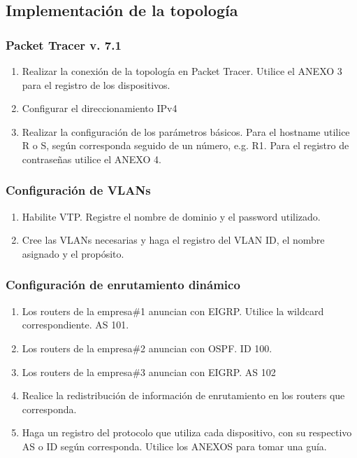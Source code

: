 \documentclass[12pt]{article}
\begin{document}
\subsection{Implementación de la topología}
\subsubsection{Packet Tracer v. 7.1}
\begin{enumerate}
\item Realizar la conexión de la topología en Packet Tracer. Utilice el ANEXO 3 para el registro de los dispositivos.
\item Configurar el direccionamiento IPv4
\item Realizar la configuración de los parámetros básicos. Para el hostname utilice R o S, según corresponda seguido de un número, e.g. R1. Para el registro de contraseñas utilice el ANEXO 4.
\end{enumerate}

\subsubsection{Configuración de VLANs}
\begin{enumerate}
\item Habilite VTP. Registre el nombre de dominio y el password utilizado.
\item Cree las VLANs necesarias y haga el registro del VLAN ID, el nombre asignado y el propósito.
\end{enumerate}

\subsubsection{Configuración de enrutamiento dinámico}
\begin{enumerate}
\item Los routers de la empresa\#1 anuncian con EIGRP. Utilice la wildcard correspondiente. AS 101.
\item Los routers de la empresa\#2 anuncian con OSPF. ID 100.
\item Los routers de la empresa\#3 anuncian con EIGRP. AS 102
\item Realice la redistribución de información de enrutamiento en los routers que corresponda.
\item Haga un registro del protocolo que utiliza cada dispositivo, con su respectivo AS o ID según corresponda. Utilice los ANEXOS para tomar una guía.
\end{enumerate}
\end{document}

